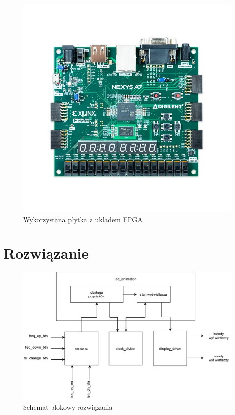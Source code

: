 \documentclass[a4paper]{article}
\begin{document}
\begin{figure}[H]
    \centering
    \includegraphics[width=\textwidth]{nexys-a7-artix-50t-fpga-xilinx-edu.jpg}
    \caption{Wykorzystana płytka z układem FPGA}
\end{figure}

\section{Rozwiązanie}
\begin{figure}[H]
    \centering
    \includegraphics[width=\textwidth]{led_animation.drawio.pdf}
    \caption{Schemat blokowy rozwiązania}
\end{figure}
\end{document}
